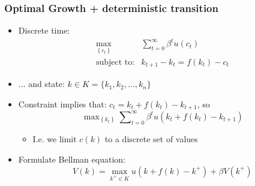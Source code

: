 \documentclass[bigger,handout]{beamer}
\newenvironment{stepitemize}{\begin{itemize}[<+->]}{\end{itemize} }
\begin{document}
\begin{frame}%
\frametitle{Optimal Growth + deterministic transition}

\begin{stepitemize}
\item Discrete time:
\begin{equation*}
\begin{array}{rc}
\max_{\left\{ c_{t}\right\} } & \sum_{t=0}^{\infty }\beta ^{t}u\left(
c_{t}\right) \\
\text{subject to:} & k_{t+1}-k_{t}=f\left( k_{t}\right) -c_{t}%
\end{array}%
\end{equation*}

\item ... and state: $k\in K=\{k_{1},k_{2},\ldots ,k_{n}\}$

\item Constraint implies that: $c_{t}=k_{t}+f\left( k_{t}\right) -k_{t+1}$,
so%
\begin{equation*}
\max\nolimits_{\left\{ k_{t}\right\} }\sum\nolimits_{t=0}^{\infty }\beta
^{t}u\left( k_{t}+f\left( k_{t}\right) -k_{t+1}\right)
\end{equation*}

\begin{stepitemize}
\item I.e. we limit $c\left( k\right) $ to a discrete set of values
\end{stepitemize}

\item Formulate Bellman equation:%
\begin{equation*}
V(k)=\max_{k^{+}\in K}u(k+f(k)-k^{+})+\beta V(k^{+})
\end{equation*}
\end{stepitemize}

\end{frame}%
\end{document}
